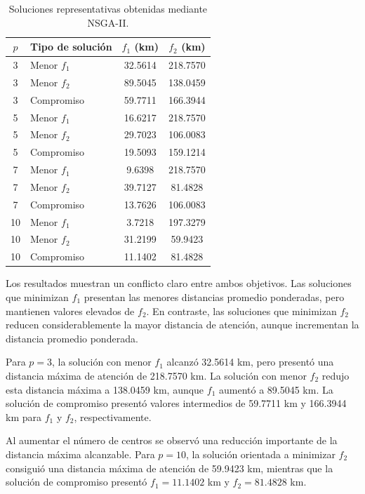 \documentclass[journal]{IEEEtran}
\begin{document}
\begin{table}[!t]
	\centering
	\caption{Soluciones representativas obtenidas mediante NSGA-II.}
	\label{tab:resumen_nsga2}
	\begin{tabular}{clcc}
		\toprule
		\textbf{$p$} &
		\textbf{Tipo de solución} &
		\textbf{$f_1$ (km)} &
		\textbf{$f_2$ (km)} \\
		\midrule
		
		3  & Menor $f_1$  & 32.5614 & 218.7570 \\
		3  & Menor $f_2$  & 89.5045 & 138.0459 \\
		3  & Compromiso   & 59.7711 & 166.3944 \\
		
		5  & Menor $f_1$  & 16.6217 & 218.7570 \\
		5  & Menor $f_2$  & 29.7023 & 106.0083 \\
		5  & Compromiso   & 19.5093 & 159.1214 \\
		
		7  & Menor $f_1$  & 9.6398  & 218.7570 \\
		7  & Menor $f_2$  & 39.7127 & 81.4828 \\
		7  & Compromiso   & 13.7626 & 106.0083 \\
		
		10 & Menor $f_1$  & 3.7218  & 197.3279 \\
		10 & Menor $f_2$  & 31.2199 & 59.9423 \\
		10 & Compromiso   & 11.1402 & 81.4828 \\
		
		\bottomrule
	\end{tabular}
\end{table}

Los resultados muestran un conflicto claro entre ambos objetivos. Las soluciones que minimizan $f_1$ presentan las menores distancias promedio ponderadas, pero mantienen valores elevados de $f_2$. En contraste, las soluciones que minimizan $f_2$ reducen considerablemente la mayor distancia de atención, aunque incrementan la distancia promedio ponderada.

Para $p=3$, la solución con menor $f_1$ alcanzó 32.5614 km, pero presentó una distancia máxima de atención de 218.7570 km. La solución con menor $f_2$ redujo esta distancia máxima a 138.0459 km, aunque $f_1$ aumentó a 89.5045 km. La solución de compromiso presentó valores intermedios de 59.7711 km y 166.3944 km para $f_1$ y $f_2$, respectivamente.

Al aumentar el número de centros se observó una reducción importante de la distancia máxima alcanzable. Para $p=10$, la solución orientada a minimizar $f_2$ consiguió una distancia máxima de atención de 59.9423 km, mientras que la solución de compromiso presentó $f_1=11.1402$ km y $f_2=81.4828$ km.
\end{document}
